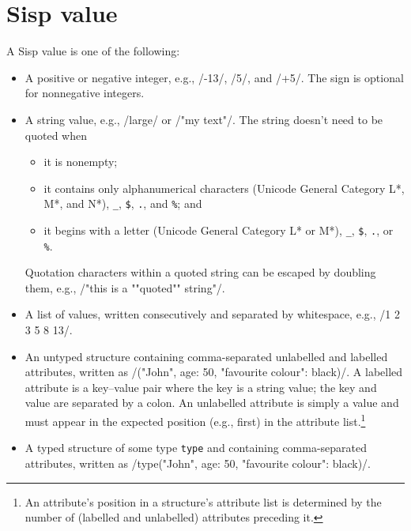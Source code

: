 \documentclass[main.tex]{subfiles}
\begin{document}
\section*{Sisp value}
A Sisp value is one of the following:
\begin{itemize}
	
	\item A positive or negative integer, e.g., \iil/-13/, \iil/5/, and \iil/+5/. The sign is optional for nonnegative integers.
	
	\item A string value, e.g., \iil/large/ or \iil/"my text"/. The string doesn't need to be quoted when
	\begin{itemize}[nosep]
		\item it is nonempty;
		\item it contains only alphanumerical characters (Unicode General Category L*, M*, and N*), \texttt{_}, \texttt{\$}, \texttt{.}, and \texttt{\%}; and
		\item it begins with a letter (Unicode General Category L* or M*), \texttt{_}, \texttt{\$}, \texttt{.}, or \texttt{\%}.
	\end{itemize}
	Quotation characters within a quoted string can be escaped by doubling them, e.g., \iil/"this is a ""quoted"" string"/.
	
	\item A list of values, written consecutively and separated by whitespace, e.g., \iil/1 2 3 5 8 13/.
	
	\item An untyped structure containing comma-separated unlabelled and labelled attributes, written as \iil/("John", age: 50, "favourite colour": black)/. A labelled attribute is a key–value pair where the key is a string value; the key and value are separated by a colon. An unlabelled attribute is simply a value and must appear in the expected position (e.g., first) in the attribute list.\footnote{An attribute's position in a structure's attribute list is determined by the number of (labelled and unlabelled) attributes preceding it.}
	
	\item A typed structure of some type \texttt{type} and containing comma-separated attributes, written as \iil/type("John", age: 50, "favourite colour": black)/.
	
\end{itemize}
\end{document}
